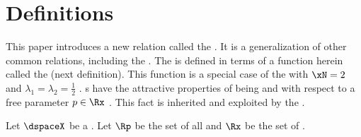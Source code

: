 \section{Definitions}
\label{sec:pdspace_def}
%

This paper introduces a new relation called the  .
It is a generalization of other common relations, including the  .
The  is defined in terms of a function herein called the  (next definition).
This function is a special case of the  with $\xN=2$ and $\lambda_1=\lambda_2=\frac{1}{2}$ .
s have the attractive properties of being  and  with respect
to a free parameter $p\in\Rx$ .
This fact is inherited and exploited by the  .
\begin{definition}
\label{def:ptf}
Let $\dspaceX$ be a  .
Let $\Rp$ be the set of all 
and $\Rx$ be the set of  .
\end{definition}

